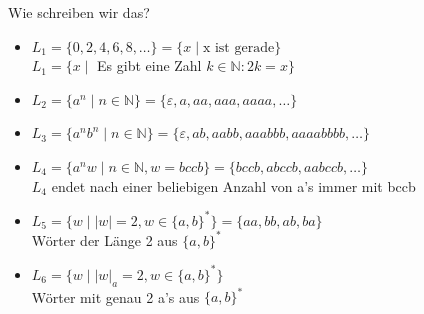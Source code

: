 \documentclass[10pt]{beamer}
\newcommand{\emptyWord}{\varepsilon}
\begin{document}
\begin{frame}[fragile]{Wie schreiben wir das?}
    \begin{itemize}[<+- | alert@+>]
        \item $L_1 = \{0,2,4,6,8,\dots\} = \{x \mid \text{x ist gerade}\}$\\
        $L_1 = \{x \mid$ Es gibt eine Zahl $k \in \mathbb{N} : 2k = x\}$\\
        
        \item $L_2 = \{a^n \mid n \in \mathbb{N}\} = \{\emptyWord, a,aa,aaa,aaaa, \dots\}$
        
        \item $L_3 = \{a^nb^n \mid n \in \mathbb{N}\} = \{\emptyWord, ab ,aabb,aaabbb,aaaabbbb, \dots\}$
        
        \item $L_4 = \{a^nw \mid n \in \mathbb{N}, w = bccb\} = \{bccb, abccb, aabccb, \dots\}$\\
        $L_4$ endet nach einer beliebigen Anzahl von a's immer mit bccb
        
        \item $L_5 = \{w \mid |w| = 2, w\in \{a,b\}^{*}\} = \{aa,bb,ab,ba\}$\\
        Wörter der Länge 2 aus $\{a,b\}^{*}$
        
        \item $L_6 = \{w \mid |w|_a = 2, w\in \{a,b\}^{*}\}$\\
        Wörter mit \alert{genau} 2 a's aus $\{a,b\}^{*}$
    \end{itemize}
\end{frame}
\end{document}
